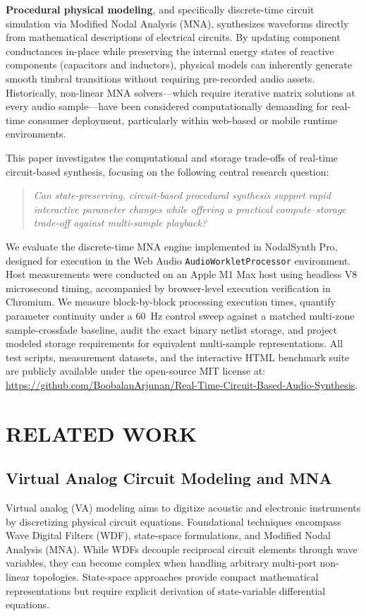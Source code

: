 \documentclass[fleqn,final]{jaes}
\begin{document}
\textbf{Procedural physical modeling}, and specifically discrete-time circuit simulation via Modified Nodal Analysis (MNA), synthesizes waveforms directly from mathematical descriptions of electrical circuits. By updating component conductances in-place while preserving the internal energy states of reactive components (capacitors and inductors), physical models can inherently generate smooth timbral transitions without requiring pre-recorded audio assets. Historically, non-linear MNA solvers---which require iterative matrix solutions at every audio sample---have been considered computationally demanding for real-time consumer deployment, particularly within web-based or mobile runtime environments.

This paper investigates the computational and storage trade-offs of real-time circuit-based synthesis, focusing on the following central research question:
\begin{quote}
\textit{Can state-preserving, circuit-based procedural synthesis support rapid interactive parameter changes while offering a practical compute--storage trade-off against multi-sample playback?}
\end{quote}

We evaluate the discrete-time MNA engine implemented in NodalSynth Pro, designed for execution in the Web Audio \texttt{AudioWorkletProcessor} environment. Host measurements were conducted on an Apple M1 Max host using headless V8 microsecond timing, accompanied by browser-level execution verification in Chromium. We measure block-by-block processing execution times, quantify parameter continuity under a 60~Hz control sweep against a matched multi-zone sample-crossfade baseline, audit the exact binary netlist storage, and project modeled storage requirements for equivalent multi-sample representations. All test scripts, measurement datasets, and the interactive HTML benchmark suite are publicly available under the open-source MIT license at: \url{https://github.com/BoobalanArjunan/Real-Time-Circuit-Based-Audio-Synthesis}.

\section{RELATED WORK}

\subsection{Virtual Analog Circuit Modeling and MNA}
Virtual analog (VA) modeling aims to digitize acoustic and electronic instruments by discretizing physical circuit equations. Foundational techniques encompass Wave Digital Filters (WDF), state-space formulations, and Modified Nodal Analysis (MNA). While WDFs \cite{fettweis1986wave, smith2010physical} decouple reciprocal circuit elements through wave variables, they can become complex when handling arbitrary multi-port non-linear topologies. State-space approaches \cite{bilbao2009numerical, valimaki2006discrete} provide compact mathematical representations but require explicit derivation of state-variable differential equations.
\end{document}

